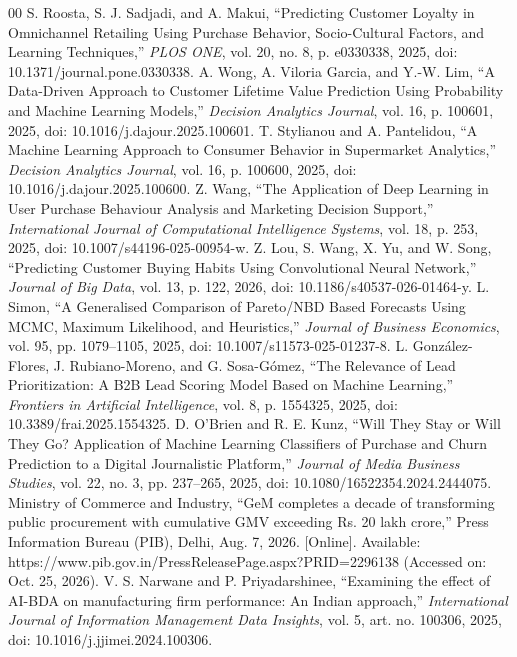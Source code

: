 \documentclass[conference]{IEEEtran}
\begin{document}
\begin{thebibliography}{00}
 S. Roosta, S. J. Sadjadi, and A. Makui, ``Predicting Customer Loyalty in Omnichannel Retailing Using Purchase Behavior, Socio-Cultural Factors, and Learning Techniques,'' \textit{PLOS ONE}, vol. 20, no. 8, p. e0330338, 2025, doi: 10.1371/journal.pone.0330338.
 A. Wong, A. Viloria Garcia, and Y.-W. Lim, ``A Data-Driven Approach to Customer Lifetime Value Prediction Using Probability and Machine Learning Models,'' \textit{Decision Analytics Journal}, vol. 16, p. 100601, 2025, doi: 10.1016/j.dajour.2025.100601.
 T. Stylianou and A. Pantelidou, ``A Machine Learning Approach to Consumer Behavior in Supermarket Analytics,'' \textit{Decision Analytics Journal}, vol. 16, p. 100600, 2025, doi: 10.1016/j.dajour.2025.100600.
 Z. Wang, ``The Application of Deep Learning in User Purchase Behaviour Analysis and Marketing Decision Support,'' \textit{International Journal of Computational Intelligence Systems}, vol. 18, p. 253, 2025, doi: 10.1007/s44196-025-00954-w.
 Z. Lou, S. Wang, X. Yu, and W. Song, ``Predicting Customer Buying Habits Using Convolutional Neural Network,'' \textit{Journal of Big Data}, vol. 13, p. 122, 2026, doi: 10.1186/s40537-026-01464-y.
 L. Simon, ``A Generalised Comparison of Pareto/NBD Based Forecasts Using MCMC, Maximum Likelihood, and Heuristics,'' \textit{Journal of Business Economics}, vol. 95, pp. 1079--1105, 2025, doi: 10.1007/s11573-025-01237-8.
 L. Gonz\'alez-Flores, J. Rubiano-Moreno, and G. Sosa-G\'omez, ``The Relevance of Lead Prioritization: A B2B Lead Scoring Model Based on Machine Learning,'' \textit{Frontiers in Artificial Intelligence}, vol. 8, p. 1554325, 2025, doi: 10.3389/frai.2025.1554325.
 D. O'Brien and R. E. Kunz, ``Will They Stay or Will They Go? Application of Machine Learning Classifiers of Purchase and Churn Prediction to a Digital Journalistic Platform,'' \textit{Journal of Media Business Studies}, vol. 22, no. 3, pp. 237--265, 2025, doi: 10.1080/16522354.2024.2444075.
 Ministry of Commerce and Industry, ``GeM completes a decade of transforming public procurement with cumulative GMV exceeding Rs. 20 lakh crore,'' Press Information Bureau (PIB), Delhi, Aug. 7, 2026. [Online]. Available: https://www.pib.gov.in/PressReleasePage.aspx?PRID=2296138 (Accessed on: Oct. 25, 2026).
 V. S. Narwane and P. Priyadarshinee, ``Examining the effect of AI-BDA on manufacturing firm performance: An Indian approach,'' \textit{International Journal of Information Management Data Insights}, vol. 5, art. no. 100306, 2025, doi: 10.1016/j.jjimei.2024.100306.

\end{thebibliography}
\end{document}
